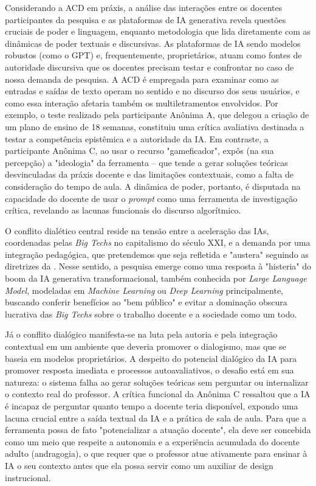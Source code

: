 \documentclass[portuguese]{textolivre}
\begin{document}
Considerando a ACD em práxis, a análise das interações entre os docentes participantes da pesquisa e as plataformas de IA generativa revela questões cruciais de poder e linguagem, enquanto metodologia que lida diretamente com as dinâmicas de poder textuais e discursivas. As plataformas de IA sendo modelos robustos (como o GPT) e, frequentemente, proprietários, atuam como fontes de autoridade discursiva que os docentes precisam testar e confrontar no caso de nossa demanda de pesquisa. A ACD é empregada para examinar como as entradas e saídas de texto operam no sentido e no discurso dos seus usuários, e como essa interação afetaria também os multiletramentos envolvidos. Por exemplo, o teste realizado pela participante Anônima A, que delegou a criação de um plano de ensino de 18 semanas, constituiu uma crítica avaliativa destinada a testar a competência epistêmica e a autoridade da IA. Em contraste, a participante Anônima C, ao usar o recurso "gameficador", expôs (na sua percepção) a "ideologia" da ferramenta – que tende a gerar soluções teóricas desvinculadas da práxis docente e das limitações contextuais, como a falta de consideração do tempo de aula. A dinâmica de poder, portanto, é disputada na capacidade do docente de usar o \textit{prompt} como uma ferramenta de investigação crítica, revelando as lacunas funcionais do discurso algorítmico.

O conflito dialético central reside na tensão entre a aceleração das IAs, coordenadas pelas \textit{Big Techs} no capitalismo do século XXI, e a demanda por uma integração pedagógica, que pretendemos que seja refletida e "austera" seguindo as diretrizes da \textcite{unesco2019beijing,unesco2023chatgpt,unesco2024guia}. Nesse sentido, a pesquisa emerge como uma resposta à "histeria" do boom da IA generativa transformacional, também conhecida por \textit{Large Language Model}, modeladas em \textit{Machine Learning} ou \textit{Deep Learning} principalmente, buscando conferir benefícios ao "bem público" e evitar a dominação obscura lucrativa das \textit{Big Techs} sobre o trabalho docente e a sociedade como um todo.

Já o conflito dialógico \cite{bakhtin2016generos} manifesta-se na luta pela autoria e pela integração contextual em um ambiente que deveria promover o dialogismo, mas que se baseia em modelos proprietários. A despeito do potencial dialógico da IA para promover resposta imediata e processos autoavaliativos, o desafio está em sua natureza: o sistema falha ao gerar soluções teóricas sem perguntar ou internalizar o contexto real do professor. A crítica funcional da Anônima C ressaltou que a IA é incapaz de perguntar quanto tempo a docente teria disponível, expondo uma lacuna crucial entre a saída textual da IA e a prática de sala de aula. Para que a ferramenta possa de fato "potencializar a atuação docente", ela deve ser concebida como um meio que respeite a autonomia e a experiência acumulada do docente adulto (andragogia), o que requer que o professor atue ativamente para ensinar à IA o seu contexto antes que ela possa servir como um auxiliar de design instrucional.
\end{document}
